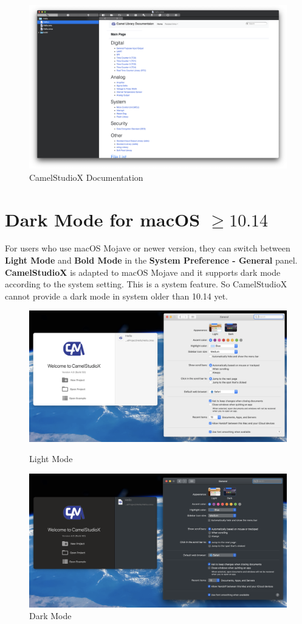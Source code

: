 \documentclass{article}
\begin{document}
		\begin{figure}[h]
			\centering
			\includegraphics[width=\textwidth]{Documentation}
			\caption{CamelStudioX Documentation}
		\end{figure}
		
	\newpage
	\section{Dark Mode for macOS ${\geq10.14}$}
	
		For users who use macOS Mojave or newer version, they can switch between \textbf{Light Mode} and \textbf{Bold Mode} in the \textbf{System Preference - General} panel.
		\textbf{CamelStudioX} is adapted to macOS Mojave and it supports dark mode according to the system setting. This is a system feature. So CamelStudioX cannot provide a dark mode in system older than 10.14 yet.
		
		\begin{figure}[!h]
			\centering
			\includegraphics[width=\textwidth]{LightMode}
			\caption{Light Mode}
			\includegraphics[width=\textwidth]{DarkMode}
			\caption{Dark Mode}
		\end{figure}
\end{document}
